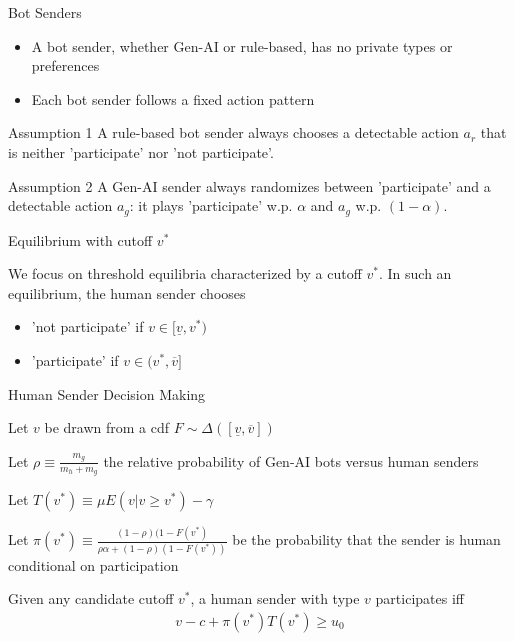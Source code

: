 \documentclass[11pt,aspectratio=169]{beamer}
\begin{document}
\begin{frame}{Bot Senders}
\begin{itemize}\setlength{\itemsep}{1em}
    \item A bot sender, whether Gen-AI or rule-based, has no private types or preferences
    \item Each bot sender follows a fixed action pattern
\end{itemize}
\vspace{1em}

\begin{exampleblock}{Assumption 1}
    A rule-based bot sender always chooses a detectable action $a_r$ that is neither 'participate' nor 'not participate'.
\end{exampleblock}

\begin{exampleblock}{Assumption 2}
    A Gen-AI sender always randomizes between 'participate' and a detectable action $a_g$: it plays 'participate' w.p. $\alpha$ and $a_g$ w.p. $(1-\alpha)$.
\end{exampleblock}
\end{frame}

\begin{frame}{Equilibrium with cutoff $v^*$}

We focus on threshold equilibria characterized by a cutoff $v^*$. In such an equilibrium, the human sender chooses
\begin{itemize}
    \item 'not participate' if $v\in [\underline{v},v^*)$
    \item 'participate' if $v\in (v^*,\overline{v}]$
\end{itemize}

\end{frame}

\begin{frame}{Human Sender Decision Making}

Let $v$ be drawn from a cdf $F\sim \Delta([\underline{v},\overline{v}])$
\vspace{1em}

Let $\rho\equiv\frac{m_g}{m_h+m_g}$ the relative probability of Gen-AI bots versus human senders

\vspace{1em}

Let $T(v^*)\equiv \mu E(v|v\geq v^*) - \gamma$

\vspace{1em}

Let $\pi(v^*)\equiv \frac{(1-\rho)(1-F(v^*)}{\rho\alpha + (1-\rho)(1-F(v^*))}$ be the probability that the sender is human conditional on participation

\vspace{1em}
Given any candidate cutoff $v^*$, a human sender with type $v$ participates iff
\begin{align*}
    v - c + \pi(v^*)T(v^*)\geq u_0
\end{align*}
\end{frame}
\end{document}
